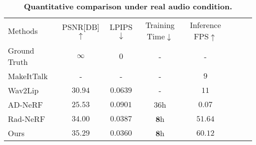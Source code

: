 \begin{table*}[t]
\begin{center}
\setlength{\tabcolsep}{10pt}
\renewcommand{\arraystretch}{1.1}
\begin{tabular}{l cc  ccc cc} 
\hline
Methods                              & PSNR[DB]$\uparrow$ & LPIPS$\downarrow$ & Training Time$\downarrow$ & Inference FPS$\uparrow$  \\   
Ground Truth                         & $\infty$       &  $0$              & -                         & -   \\
\hline
MakeItTalk~\cite{zhou2020makelttalk} & -       & -         & -     & $9$            \\
Wav2Lip~\cite{prajwal2020lip}        & $30.94$ & $0.0639$ & -     & $11$            \\
AD-NeRF~\cite{guo2021ad}             & $25.53$ & $0.0901$ & $36$h & $0.07$          \\
Rad-NeRF~\cite{tang2022radnerf}      & $34.00$ & $0.0387$ & $\mathbf{8}$h  & $\mathbf{51.64}$ \\
\hline
Ours                                 & $\mathbf{35.29}$ & $\mathbf{0.0360}$ & $\mathbf{8}$h  & $\mathbf{60.12}$ \\

\hline 
\end{tabular}
\end{center}
\vspace{-0.3cm}
\caption{\textbf{Quantitative comparison under real audio condition.} 
}
\label{tab:Quantitative}
\end{table*}